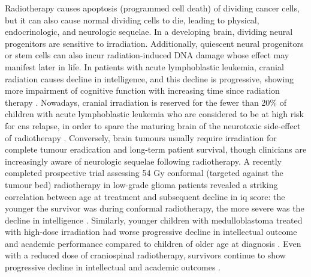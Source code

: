 Radiotherapy causes apoptosis (programmed cell death) of dividing cancer cells, but it can also cause normal dividing cells to die, leading to physical, endocrinologic, and neurologic sequelae. In a developing brain, dividing neural progenitors are sensitive to irradiation. Additionally, quiescent neural progenitors or stem cells can also incur radiation-induced DNA damage whose effect may manifest later in life. In patients with acute lymphoblastic leukemia, cranial radiation causes decline in intelligence, and this decline is progressive, showing more impairment of cognitive function with increasing time since radiation therapy . Nowadays, cranial irradiation is reserved for the fewer than 20\% of children with acute lymphoblastic leukemia who are considered to be at high risk for \gls{cns} relapse, in order to spare the maturing brain of the neurotoxic side-effect of radiotherapy . Conversely, brain tumours usually require irradiation for complete tumour eradication and long-term patient survival, though clinicians are increasingly aware of neurologic sequelae following radiotherapy. A recently completed prospective trial assessing 54 Gy conformal (targeted against the tumour bed) radiotherapy in low-grade glioma patients revealed a striking correlation between age at treatment and subsequent decline in \gls{iq} score: the younger the survivor was during conformal radiotherapy, the more severe was the decline in intelligence . Similarly, younger children with medulloblastoma treated with high-dose irradiation had worse progressive decline in intellectual outcome and academic performance compared to children of older age at diagnosis . Even with a reduced dose of craniospinal radiotherapy, survivors continue to show progressive decline in intellectual and academic outcomes .

